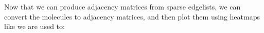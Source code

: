 Now that we can produce adjacency matrices from sparse edgelists, we can convert the molecules to adjacency matrices, and then plot them using heatmaps like we are used to:

\begin{lstlisting}[style=python]

\end{lstlisting}



\begin{lstlisting}[style=python]

\end{lstlisting}



\begin{lstlisting}[style=python]

\end{lstlisting}



\begin{lstlisting}[style=python]

\end{lstlisting}



\begin{lstlisting}[style=python]

\end{lstlisting}



\begin{lstlisting}[style=python]

\end{lstlisting}



\begin{lstlisting}[style=python]

\end{lstlisting}


